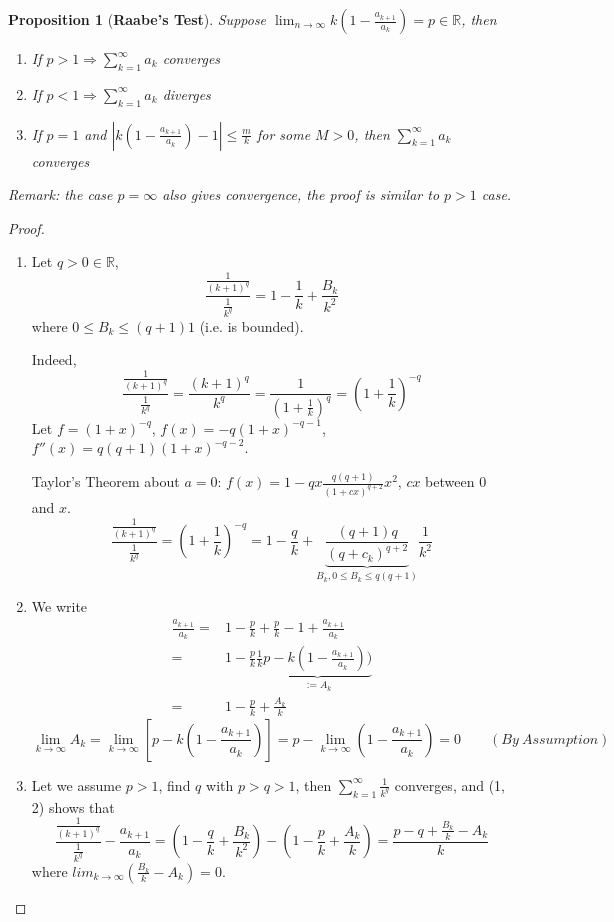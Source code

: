\documentclass[12pt]{article}
\theoremstyle{plain}
\newtheorem{proposition}{Proposition}[subsection]
\newcommand{\abs}[1]{\left| #1 \right|}
\newcommand{\mR}{{\mathbb{R}}}
\begin{document}
\begin{proposition}[\textbf{Raabe's Test}]
	Suppose $\lim_{n\to\infty} k (1-\frac{a_{k+1}}{a_k}) = p \in \mR$,
	then 
	\begin{enumerate}
		\item If $p > 1 \Rightarrow \sum_{k=1}^{\infty} a_k$ converges
		\item If $p < 1 \Rightarrow \sum_{k=1}^{\infty} a_k$ diverges
		\item If $p = 1$ and $\abs{k(1-\frac{a_{k+1}}{a_k})-1}\leq \frac mk$ 
			for some $M>0$, then $\sum_{k=1}^{\infty} a_k$ converges
	\end{enumerate}
	\textit{Remark:} the case $p = \infty$ also gives convergence, the proof is
	similar to $p > 1$ case. 
\end{proposition}
\begin{proof}
	$ $
\begin{enumerate}
\item 
	Let $q>0 \in \mR$, 
	\[
		\frac{\frac 1{(k+1)^q}}{\frac 1{k^q}} = 1-\frac 1k + \frac{B_k}{k^2}
	\]
	where $0 \leq B_k \leq (q+1)1$ (i.e. is bounded).

	Indeed, 
	\[
		\frac{\frac 1{(k+1)^q}}{\frac 1{k^q}} = 
		\frac{(k+1)^q}{k^q}
		= \frac1{(1+\frac1k)^q}
		= (1+\frac 1k)^{-q}
	\]
	Let $f = (1+x)^{-q}$, $f(x) = -q(1+x)^{-q-1}$, $f''(x) = q(q+1)(1+x)^{-q-2}$.

	Taylor's Theorem about $a = 0$: $f(x) = 1-qx \frac{q(q+1)}{(1+cx)^{q+2}}x^2$,
	$cx$ between $0$ and $x$.
	\[
		\frac{\frac 1{(k+1)^q}}{\frac 1{k^q}} 
		= (1+\frac 1k)^{-q}
		= 1- \frac qk + 
		\underbrace{\frac{(q+1)q}{(q+c_k)^{q+2}}}_{B_k, 0\leq B_k \leq q(q+1)}
		\frac 1{k^2} 
	\]

\item
	We write 
	\begin{align*}
		\frac{a_{k+1}}{a_k} 
		=& 1-\frac pk + \frac pk - 1 + \frac{a_{k+1}}{a_k}	\\
	=& 1- \frac pk \frac 1k \underbrace{p-k(1-\frac {a_{k+1}}{a_k}))}_{:=A_k}\\
	=& 1- \frac pk + \frac{A_k}k
	\end{align*}
\[
	\lim_{k\to\infty} A_k = \lim_{k\to\infty} [p-k(1-\frac{a_{k+1}}{a_k})]
	= p - \lim_{k\to\infty} (1-\frac{a_{k+1}}{a_k}) = 0 
	\qquad (By \ Assumption)
\]

\item Let we assume $p > 1$, find $q$ with $p > q > 1$, then 
	$\sum_{k=1}^{\infty} \frac1{k^q}$ converges, and (1, 2) shows that 
	\[
		\frac{\frac 1{(k+1)^q}}{\frac 1{k^q}} - \frac{a_{k+1}}{a_k}
		 = (1-\frac qk + \frac{B_k}{k^2}) - (1-\frac pk + \frac{A_k}k)
		 = \frac{p-q+\frac{B_k}k - A_k}k
	\]
	where $lim_{k\to\infty}(\frac{B_k}k - A_k)=0$.
	

\end{enumerate}
\end{proof}
\end{document}
